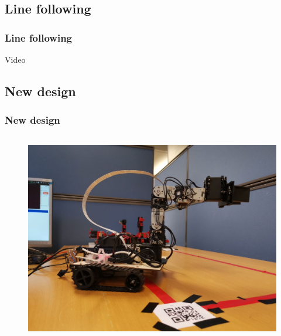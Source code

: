 \subsection{Line following}
\begin{frame}
    \frametitle{Line following}
    \begin{center}
        \Huge Video
    \end{center}
\end{frame}

\subsection{New design}
\begin{frame}
    \frametitle{New design}
    \begin{columns}
        \begin{column}[]{0.5\textwidth}
            \begin{figure}
                \centering
                \includegraphics[width=\textwidth]{frames/img/view1.jpg}
            \end{figure}
            

\end{column}
\end{columns}
\end{frame}

